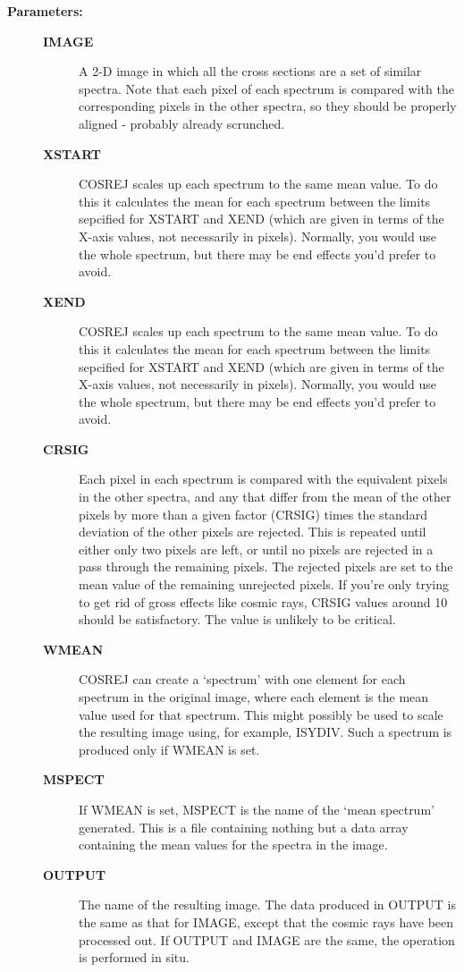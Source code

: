 \begin{description}
\item [{\bf Parameters:}]
\begin{description}
\item [{\bf IMAGE}]
 A 2-D image in which all the cross sections are a
 set of similar spectra.  Note that each pixel of
 each spectrum is compared with the corresponding
 pixels in the other spectra, so they should be
 properly aligned - probably already scrunched.
\item [{\bf XSTART}]
 COSREJ scales up each spectrum to the same mean value.
 To do this it calculates the mean for each spectrum
 between the limits sepcified for XSTART and XEND (which
 are given in terms of the X-axis values, not necessarily
 in pixels).  Normally, you would use the whole spectrum,
 but there may be end effects you'd prefer to avoid.
\item [{\bf XEND}]
 COSREJ scales up each spectrum to the same mean value.
 To do this it calculates the mean for each spectrum
 between the limits sepcified for XSTART and XEND (which
 are given in terms of the X-axis values, not necessarily
 in pixels).  Normally, you would use the whole spectrum,
 but there may be end effects you'd prefer to avoid.
\item [{\bf CRSIG}]
 Each pixel in each spectrum is compared with the equivalent
 pixels in the other spectra, and any that differ from the
 mean of the other pixels by more than a given factor (CRSIG)
 times the standard deviation of the other pixels are
 rejected.  This is repeated until either only two pixels
 are left, or until no pixels are rejected in a pass through
 the remaining pixels.  The rejected pixels are set to the
 mean value of the remaining unrejected pixels.  If you're
 only trying to get rid of gross effects like cosmic rays,
 CRSIG values around 10 should be satisfactory.  The value
 is unlikely to be critical.
\item [{\bf WMEAN}]
 COSREJ can create a `spectrum' with one element for each
 spectrum in the original image, where each element is
 the mean value used for that spectrum.  This might possibly
 be used to scale the resulting image using, for example,
 ISYDIV.  Such a spectrum is produced only if WMEAN is
 set.
\item [{\bf MSPECT}]
 If WMEAN is set, MSPECT is the name of the `mean spectrum'
 generated.  This is a file containing nothing but a data
 array containing the mean values for the spectra in the image.
\item [{\bf OUTPUT}]
 The name of the resulting image. The data produced in
 OUTPUT is the same as that for IMAGE, except that the
 cosmic rays have been processed out.  If OUTPUT and
 IMAGE are the same, the operation is performed in situ.
\end{description}


\end{description}
